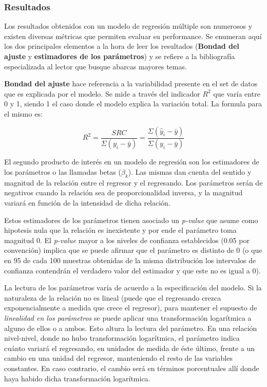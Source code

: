 \subsubsection{Resultados}

Los resultados obtenidos con un modelo de regresión múltiple son numerosos y existen diversas métricas que permiten evaluar su performance. Se enumeran aquí los dos principales elementos a la hora de leer los resultados (\textbf{Bondad del ajuste} y \textbf{estimadores de los parámetros}) y se refiere a la bibliografía especializada \cite{wooldridge,hastie} al lector que busque abarcas mayores temas.  

\textbf{Bondad del ajuste} hace referencia a la variabilidad presente en el set de datos que es explicada por el modelo. Se mide a través del indicador $R^2$ que varía entre 0 y 1, siendo 1 el caso donde el modelo explica la variación total. La formula para el mismo es:

$$R^2 = \frac{SRC}{\Sigma(y_i - \bar{y})} = \frac{\Sigma(\hat{y}_i - \bar{y})}{\Sigma(y_i - \bar{y})} $$

El segundo producto de interés en un modelo de regresión son los estimadores de los parámetros o las llamadas betas ($\beta_k$). Las mismas dan cuenta del sentido y magnitud de la relación entre el regresor y el regresando. Los parámetros serán de negativos cuando la relación sea de proporcionalidad inversa, y la magnitud variará en función de la intensidad de dicha relación. 

Estos estimadores de los parámetros tienen asociado un \textit{p-value} que asume como hipotesis nula que la relación es inexistente y por ende el parámetro toma magnitud 0. El \textit{p-value} mayor a los niveles de confianza establecidos (0.05 por convención) implica que se puede afirmar que el parámetro es distinto de 0  (o que en 95 de cada 100 muestras obtenidas de la misma distribución los intervalos de confianza contendrán el verdadero valor del estimador y que este no es igual a 0).

La lectura de los parámetros varía de acuerdo a la especificación del modelo. Si la naturaleza de la relación no es lineal (puede que el regresando crezca exponencialmente a medida que crece el regresor), para mantener el supuesto de \textit{linealidad en los parámetros} se puede aplicar una transformación logarítmica a alguno de ellos o a ambos. Esto altura la lectura del parámetro. En una relación nivel-nivel, donde no hubo transformación logarítmica, el parámetro indica cuánto variará el regresando, en unidades de medida de éste último, frente a un cambio en una unidad del regresor, manteniendo el resto de las variables constantes. En caso contrario, el cambio será en términos porcentuales allí donde haya habido dicha transformación logarítmica.  

